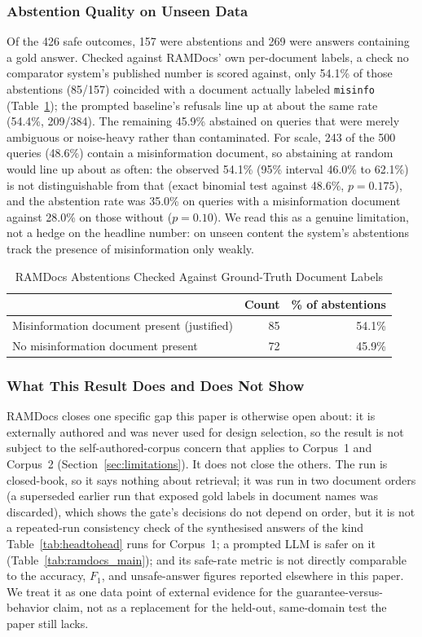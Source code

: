 \documentclass[conference]{IEEEtran}
\begin{document}
\subsubsection{Abstention Quality on Unseen Data}
Of the 426 safe outcomes, 157 were abstentions and 269 were answers
containing a gold answer. Checked against RAMDocs' own per-document labels,
a check no comparator system's published number is scored against, only
54.1\% of those abstentions (85/157) coincided with a document actually
labeled \texttt{misinfo} (Table~\ref{tab:ramdocs_abstain}); the prompted
baseline's refusals line up at about the same rate (54.4\%, 209/384). The remaining
45.9\% abstained on queries that were merely ambiguous or noise-heavy rather
than contaminated. For scale, 243 of the 500 queries (48.6\%) contain a
misinformation document, so abstaining at random would line up about as
often: the observed 54.1\% (95\% interval 46.0\% to 62.1\%) is not
distinguishable from that (exact binomial test against 48.6\%,
$p=0.175$), and the abstention rate was 35.0\% on
queries with a misinformation document against 28.0\% on those without
($p=0.10$). We read this as a genuine limitation, not a hedge on the
headline number: on unseen content the system's abstentions track the
presence of misinformation only weakly.

\begin{table}[htbp]
\caption{RAMDocs Abstentions Checked Against Ground-Truth Document Labels}
\label{tab:ramdocs_abstain}
\centering
\small
\begin{tabularx}{\columnwidth}{@{}X r r@{}}
\toprule
 & Count & \% of abstentions \\
\midrule
Misinformation document present (justified)   & 85 & 54.1\% \\
No misinformation document present            & 72 & 45.9\% \\
\bottomrule
\end{tabularx}
\end{table}

\subsubsection{What This Result Does and Does Not Show}
RAMDocs closes one specific gap this paper is otherwise open about: it is
externally authored and was never used for design selection, so the result
is not subject to the self-authored-corpus concern that applies to Corpus~1
and Corpus~2 (Section~\ref{sec:limitations}). It does not close the others.
The run is closed-book, so it says nothing about retrieval; it was run in
two document orders (a superseded earlier run that exposed gold labels in
document names was discarded), which shows the gate's decisions do not
depend on order, but it is not a repeated-run consistency check of the
synthesised answers of the kind Table~\ref{tab:headtohead} runs for
Corpus~1; a prompted LLM is safer on it
(Table~\ref{tab:ramdocs_main}); and its safe-rate metric is not directly
comparable to the accuracy, $F_1$, and unsafe-answer figures reported
elsewhere in this paper. We treat it as one data point of external evidence
for the guarantee-versus-behavior claim, not as a replacement for the
held-out, same-domain test the paper still lacks.
\end{document}
